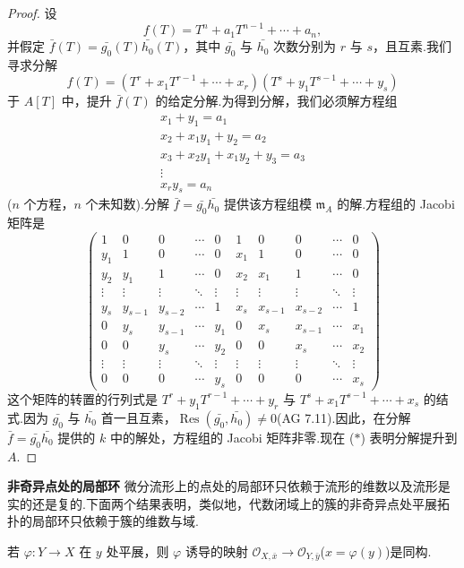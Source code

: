 \begin{proof}
设
\[
f(T) = T^{n} + a_1 T^{n-1} + \cdots + a_n,
\]
并假定 $\bar{f}(T) = \bar{g_0}(T)\bar{h_0}(T)$，其中 $\bar{g_0}$ 与 $\bar{h_0}$ 次数分别为 $r$ 与 $s$，且互素.我们寻求分解
\[
f(T) = (T^{r} + x_1 T^{r-1} + \cdots + x_r)(T^{s} + y_1 T^{s-1} + \cdots + y_s)
\]
于 $A[T]$ 中，提升 $\bar{f}(T)$ 的给定分解.为得到分解，我们必须解方程组
\[
\begin{array}{c}
x_1 + y_1 = a_1 \\
x_2 + x_1 y_1 + y_2 = a_2 \\
x_3 + x_2 y_1 + x_1 y_2 + y_3 = a_3 \\
\vdots \\
x_r y_s = a_n
\end{array}
\]
($n$ 个方程，$n$ 个未知数).分解 $\bar{f} = \bar{g_0}\bar{h_0}$ 提供该方程组模 $\mathfrak{m}_{A}$ 的解.方程组的 Jacobi 矩阵是
\[
\begin{pmatrix}
1 & 0 & 0 & \cdots & 0 & 1 & 0 & 0 & \cdots & 0\\
y_1 & 1 & 0 & \cdots & 0 & x_1 & 1 & 0 & \cdots & 0\\
y_2 & y_1 & 1 & \cdots & 0 & x_2 & x_1 & 1 & \cdots & 0\\
\vdots & \vdots & \vdots & \ddots & \vdots & \vdots & \vdots & \vdots & \ddots & \vdots\\
y_s & y_{s-1} & y_{s-2} & \cdots & 1 & x_s & x_{s-1} & x_{s-2} & \cdots & 1\\
0 & y_s & y_{s-1} & \cdots & y_1 & 0 & x_s & x_{s-1} & \cdots & x_1\\
0 & 0 & y_s & \cdots & y_2 & 0 & 0 & x_s & \cdots & x_2\\
\vdots & \vdots & \vdots & \ddots & \vdots & \vdots & \vdots & \vdots & \ddots & \vdots\\
0 & 0 & 0 & \cdots & y_s & 0 & 0 & 0 & \cdots & x_s
\end{pmatrix}
\]
这个矩阵的转置的行列式是 $T^{r} + y_1 T^{r-1} + \cdots + y_r$ 与 $T^{s} + x_1 T^{s-1} + \cdots + x_s$ 的结式.因为 $\bar{g_0}$ 与 $\bar{h_0}$ 首一且互素，$\operatorname{Res}(\bar{g_0}, \bar{h_0}) \neq 0$(AG 7.11).因此，在分解 $\bar{f} = \bar{g_0}\bar{h_0}$ 提供的 $k$ 中的解处，方程组的 Jacobi 矩阵非零.现在 ($\ast$) 表明分解提升到 $A$.
\end{proof}

\textbf{非奇异点处的局部环} 微分流形上的点处的局部环只依赖于流形的维数以及流形是实的还是复的.下面两个结果表明，类似地，代数闭域上的簇的非奇异点处平展拓扑的局部环只依赖于簇的维数与域.

\begin{proposition}\label{prop:4.8}
若 $\varphi \colon Y \to X$ 在 $y$ 处平展，则 $\varphi$ 诱导的映射 $\mathcal{O}_{X, \bar{x}} \to \mathcal{O}_{Y, \bar{y}}$($x = \varphi(y)$)是同构.
\end{proposition}

